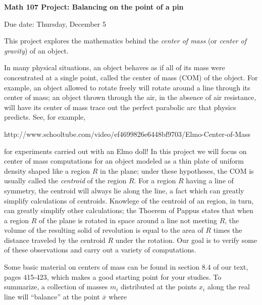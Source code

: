 


\loadmsbm

\def\dsp{\displaystyle}

\centerline{\bf Math 107 Project: Balancing on the point of a pin}

\medskip

\centerline{Due date: Thursday, December 5}

\medskip

This project explores the mathematics behind the
{\it center of mass} (or {\it center of gravity}) of an object.

\medskip

In many physical situations, an object behaves as if all of its mass
were concentrated at a single point, called the center of mass (COM) of the
object. For example, an object allowed to rotate freely will rotate around 
a line through its 
center of mass; an object thrown through the air, in the absence of air 
resistance, will have its center of mass trace out 
the perfect parabolic arc that physics predicts. See, for example,

\smallskip

\centerline{http://www.schooltube.com/video/ef4699826e6448bf9703/Elmo-Center-of-Mass}

\smallskip

\noindent for experiments carried out with an Elmo doll! 
In this project we will focus on center of mass computations for an object
modeled as a thin plate of uniform density shaped like a region $R$
in the plane; under these hypotheses, the COM is usually called the {\it centroid}
of the region $R$.
For a region $R$ having a 
line of symmetry, the centroid will always lie along the line, a fact which 
can greatly simplify calculations of centroids. Knowlege of the centroid of an 
region, in turn, can greatly simplify other calculations; the Thoerem of Pappus
states that when a region $R$ of the plane is rotated  in space around a line not meeting
$R$, the volume of the resulting solid of revolution is equal to the area of $R$
times the distance traveled by the centroid $R$ under the rotation. Our goal 
is to verify some of these observations and carry out a variety of computations.

\bigskip

Some basic material on centers of mass can be found in section 8.4 of our text, pages
415-423, which makes a good starting point for your studies. To summarize, a collection
of masses $m_i$ distributed at the points $x_i$ along the real line will ``balance''
at the point $\overline{x}$ where 

